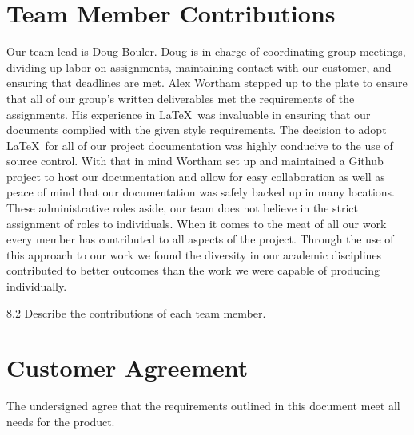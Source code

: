 \documentclass[12pt,letterpaper]{article}
\begin{document}
\section{Team Member Contributions}

Our team lead is Doug Bouler. Doug is in charge of coordinating group
meetings, dividing up labor on assignments, maintaining contact with our
customer, and ensuring that deadlines are met.  Alex Wortham stepped up to the
plate to ensure that all of our group's written deliverables met the
requirements of the assignments.  His experience in \LaTeX\ was invaluable in
ensuring that our documents complied with the given style requirements.  The
decision to adopt \LaTeX\ for all of our project documentation was highly
conducive to the use of source control.  With that in mind Wortham set up and
maintained a Github project to host our documentation and allow for easy
collaboration as well as peace of mind that our documentation was safely backed
up in many locations.  These administrative roles aside, our team does not
believe in the strict assignment of roles to individuals.  When it comes to the
meat of all our work every member has contributed to all aspects of the project.
Through the use of this approach to our work we found the diversity in our
academic disciplines contributed to better outcomes than the work we were
capable of producing individually. 




8.2 Describe the contributions of each team member.
\newpage
\section{Customer Agreement}


The undersigned agree that the requirements outlined in this document meet all needs for the product.


\end{document}
